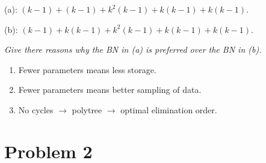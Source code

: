 \documentclass{article}
\begin{document}
\begin{enumerate}[(a)]
  (a): $(k-1)+(k-1)+k^2(k-1)+k(k-1)+k(k-1)$.

  (b): $(k-1)+k(k-1)+k^2(k-1)+k(k-1)+k(k-1)$.   

  \textit{Give there reasons why the BN in (a) is preferred over the BN in (b).}

  \begin{enumerate} 
  \item Fewer parameters means less storage.
  \item Fewer parameters means better sampling of data. 
  \item No cycles $\rightarrow$ polytree $\rightarrow$ optimal elimination order.
  \end{enumerate}

\end{enumerate}

\section{Problem 2}
\end{document}
